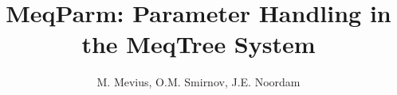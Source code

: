 \documentclass[11pt,twoside]{article}  %
\begin{document}

%
%


%
%
%
%

\title{MeqParm: Parameter Handling in the MeqTree System}

%

\author{M. Mevius, O.M. Smirnov, J.E. Noordam}
\end{document}
